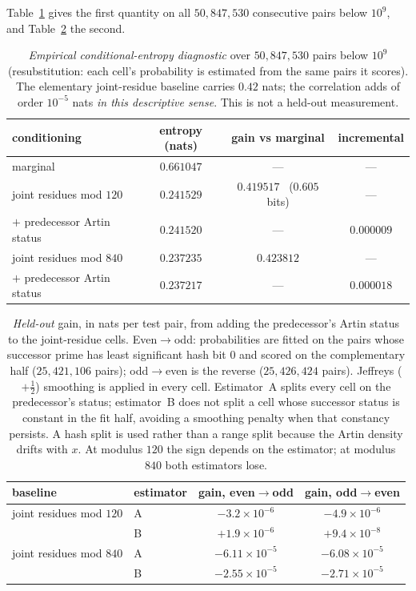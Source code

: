 Table~\ref{tab:content} gives the first quantity on all $50{,}847{,}530$ consecutive pairs below
$10^9$, and Table~\ref{tab:holdout} the second.

\begin{table}[t]
	\centering
	\begin{tabular}{lccc}
		\toprule
		conditioning & entropy (nats) & gain vs marginal & incremental \\
		\midrule
		marginal & $0.661047$ & --- & --- \\
		joint residues mod $120$ & $0.241529$ & $0.419517$ \ ($0.605$ bits) & --- \\
		\quad $+$ predecessor Artin status & $0.241520$ & --- & $\mathbf{0.000009}$ \\
		\midrule
		joint residues mod $840$ & $0.237235$ & $0.423812$ & --- \\
		\quad $+$ predecessor Artin status & $0.237217$ & --- & $\mathbf{0.000018}$ \\
		\bottomrule
	\end{tabular}
	\caption{\emph{Empirical conditional-entropy diagnostic} over $50{,}847{,}530$ pairs below
	$10^9$ (resubstitution: each cell's probability is estimated from the same pairs it scores).
	The elementary joint-residue baseline carries $0.42$ nats; the correlation adds of order
	$10^{-5}$ nats \emph{in this descriptive sense}. This is not a held-out measurement.}
	\label{tab:content}
\end{table}

\begin{table}[t]
	\centering
	\begin{tabular}{llcc}
		\toprule
		baseline & estimator & gain, even$\to$odd & gain, odd$\to$even \\
		\midrule
		joint residues mod $120$ & A & $-3.2\times10^{-6}$ & $-4.9\times10^{-6}$ \\
		& B & $+1.9\times10^{-6}$ & $+9.4\times10^{-8}$ \\
		\midrule
		joint residues mod $840$ & A & $-6.11\times10^{-5}$ & $-6.08\times10^{-5}$ \\
		& B & $-2.55\times10^{-5}$ & $-2.71\times10^{-5}$ \\
		\bottomrule
	\end{tabular}
	\caption{\emph{Held-out} gain, in nats per test pair, from adding the predecessor's Artin
	status to the joint-residue cells. Even$\to$odd: probabilities are fitted on the pairs whose
	successor prime has least significant hash bit $0$ and scored on the complementary half
	($25{,}421{,}106$ pairs); odd$\to$even is the reverse ($25{,}426{,}424$ pairs). Jeffreys
	($+\tfrac12$) smoothing is applied in every cell. Estimator~A splits every cell on the
	predecessor's status; estimator~B does not split a cell whose successor status is constant in
	the fit half, avoiding a smoothing penalty when that constancy persists. A hash split is used rather than
	a range split because the Artin density drifts with $x$. At modulus $120$ the sign depends on
	the estimator; at modulus $840$ both estimators lose.}
	\label{tab:holdout}
\end{table}

